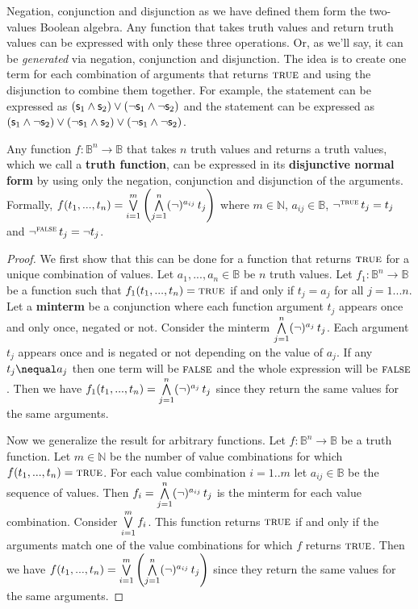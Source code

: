 \documentclass[11pt,letterpaper,fleqn]{memoir} %
\begin{document}
Negation, conjunction and disjunction as we have defined them form the two-values Boolean algebra. Any function that takes truth values and return truth values can be expressed with only these three operations. Or, as we'll say, it can be \emph{generated} via negation, conjunction and disjunction. The idea is to create one term for each combination of arguments that returns $\textsc{true}$ and using the disjunction to combine them together. For example, the statement  can be expressed as $(\mathsf{s}_1 \wedge \mathsf{s}_2) \vee (\neg \mathsf{s}_1 \wedge \neg \mathsf{s}_2)$ and the statement  can be expressed as $(\mathsf{s}_1 \wedge \neg \mathsf{s}_2) \vee (\neg \mathsf{s}_1 \wedge \mathsf{s}_2) \vee (\neg \mathsf{s}_1 \wedge \neg \mathsf{s}_2)$.

\begin{mathSection}
	\begin{prop}\label{prop_disjunctive_normal_form}
		Any function $f : \mathbb{B}^n \to \mathbb{B}$ that takes $n$ truth values and returns a truth values, which we call a \textbf{truth function}, can be expressed in its \textbf{disjunctive normal form} by using only the negation, conjunction and disjunction of the arguments. Formally, $f(t_1, ..., t_n) =\bigvee \limits_{i=1}^m \left( \bigwedge \limits_{j=1}^n (\neg)^{a_{ij}} \, t_j \right)$ where $m \in \mathbb{N}$, $a_{ij} \in \mathbb{B}$, $\neg ^ {\textsc{true}} \, t_j = t_j$ and $\neg ^ {\textsc{false}} \, t_j = \neg t_j$.
	\end{prop}
	\begin{proof}
		We first show that this can be done for a function that returns $\textsc{true}$ for a unique combination of values. Let $a_1, ..., a_n \in \mathbb{B}$ be $n$ truth values. Let $f_1: \mathbb{B}^n \to \mathbb{B}$ be a function such that $f_1(t_1, ..., t_n) = \textsc{true}$ if and only if $t_j = a_j$ for all $j=1...n$. Let a \textbf{minterm} be a conjunction where each function argument $t_j$ appears once and only once, negated or not. Consider the minterm $\bigwedge \limits_{j=1}^n (\neg)^{a_{j}} \, t_j$. Each argument $t_j$ appears once and is negated or not depending on the value of $a_j$. If any $t_j \nequal a_j$ then one term will be $\textsc{false}$ and the whole expression will be $\textsc{false}$. Then we have $f_1(t_1, ..., t_n) = \bigwedge \limits_{j=1}^n (\neg)^{a_{j}} \, t_j$ since they return the same values for the same arguments.
		
		Now we generalize the result for arbitrary functions. Let $f : \mathbb{B}^n \to \mathbb{B}$ be a truth function. Let $m \in \mathbb{N}$ be the number of value combinations for which $f(t_1, ..., t_n) = \textsc{true}$. For each value combination $i=1..m$ let $a_{ij} \in \mathbb{B}$ be the sequence of values. Then $f_i = \bigwedge \limits_{j=1}^n (\neg)^{a_{ij}} \, t_j$ is the minterm for each value combination. Consider $\bigvee \limits_{i=1}^m f_i$. This function returns $\textsc{true}$ if and only if the arguments match one of the value combinations for which $f$ returns $\textsc{true}$. Then we have $f(t_1, ..., t_n) =\bigvee \limits_{i=1}^m \left( \bigwedge \limits_{j=1}^n (\neg)^{a_{ij}} \, t_j \right)$ since they return the same values for the same arguments.
		

\end{proof}
\end{mathSection}
\end{document}
